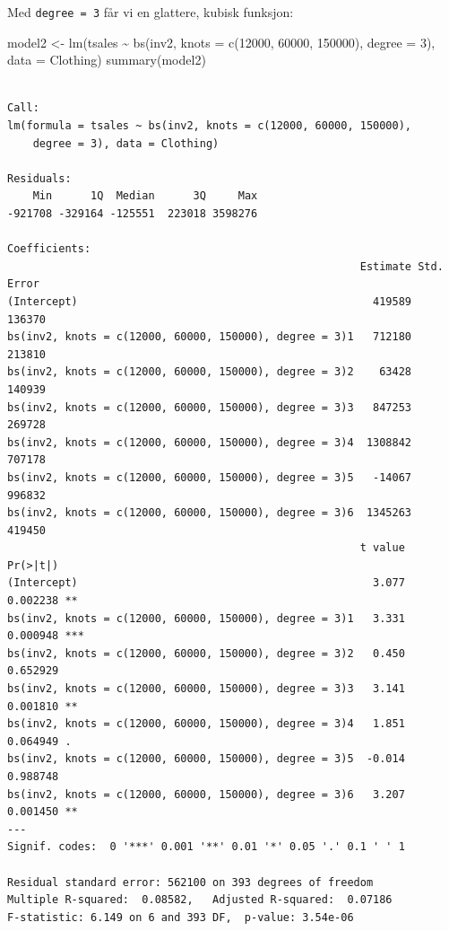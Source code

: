 \documentclass[
  letterpaper,
  DIV=11,
  numbers=noendperiod]{scrreprt}
\newenvironment{Shaded}{\begin{snugshade}}{\end{snugshade}}
\newcommand{\AttributeTok}[1]{\textcolor[rgb]{0.40,0.45,0.13}{#1}}
\newcommand{\DecValTok}[1]{\textcolor[rgb]{0.68,0.00,0.00}{#1}}
\newcommand{\FunctionTok}[1]{\textcolor[rgb]{0.28,0.35,0.67}{#1}}
\newcommand{\NormalTok}[1]{\textcolor[rgb]{0.00,0.23,0.31}{#1}}
\newcommand{\OtherTok}[1]{\textcolor[rgb]{0.00,0.23,0.31}{#1}}
\newcommand{\SpecialCharTok}[1]{\textcolor[rgb]{0.37,0.37,0.37}{#1}}
\begin{document}
Med \texttt{degree\ =\ 3} får vi en glattere, kubisk funksjon:

\begin{Shaded}
\begin{Highlighting}[]
\NormalTok{model2 }\OtherTok{\textless{}{-}} \FunctionTok{lm}\NormalTok{(tsales }\SpecialCharTok{\textasciitilde{}} \FunctionTok{bs}\NormalTok{(inv2, }\AttributeTok{knots =} \FunctionTok{c}\NormalTok{(}\DecValTok{12000}\NormalTok{, }\DecValTok{60000}\NormalTok{, }\DecValTok{150000}\NormalTok{), }\AttributeTok{degree =} \DecValTok{3}\NormalTok{), }\AttributeTok{data =}\NormalTok{ Clothing)}
\FunctionTok{summary}\NormalTok{(model2)}
\end{Highlighting}
\end{Shaded}

\begin{verbatim}

Call:
lm(formula = tsales ~ bs(inv2, knots = c(12000, 60000, 150000), 
    degree = 3), data = Clothing)

Residuals:
    Min      1Q  Median      3Q     Max 
-921708 -329164 -125551  223018 3598276 

Coefficients:
                                                       Estimate Std. Error
(Intercept)                                              419589     136370
bs(inv2, knots = c(12000, 60000, 150000), degree = 3)1   712180     213810
bs(inv2, knots = c(12000, 60000, 150000), degree = 3)2    63428     140939
bs(inv2, knots = c(12000, 60000, 150000), degree = 3)3   847253     269728
bs(inv2, knots = c(12000, 60000, 150000), degree = 3)4  1308842     707178
bs(inv2, knots = c(12000, 60000, 150000), degree = 3)5   -14067     996832
bs(inv2, knots = c(12000, 60000, 150000), degree = 3)6  1345263     419450
                                                       t value Pr(>|t|)    
(Intercept)                                              3.077 0.002238 ** 
bs(inv2, knots = c(12000, 60000, 150000), degree = 3)1   3.331 0.000948 ***
bs(inv2, knots = c(12000, 60000, 150000), degree = 3)2   0.450 0.652929    
bs(inv2, knots = c(12000, 60000, 150000), degree = 3)3   3.141 0.001810 ** 
bs(inv2, knots = c(12000, 60000, 150000), degree = 3)4   1.851 0.064949 .  
bs(inv2, knots = c(12000, 60000, 150000), degree = 3)5  -0.014 0.988748    
bs(inv2, knots = c(12000, 60000, 150000), degree = 3)6   3.207 0.001450 ** 
---
Signif. codes:  0 '***' 0.001 '**' 0.01 '*' 0.05 '.' 0.1 ' ' 1

Residual standard error: 562100 on 393 degrees of freedom
Multiple R-squared:  0.08582,   Adjusted R-squared:  0.07186 
F-statistic: 6.149 on 6 and 393 DF,  p-value: 3.54e-06
\end{verbatim}
\end{document}
